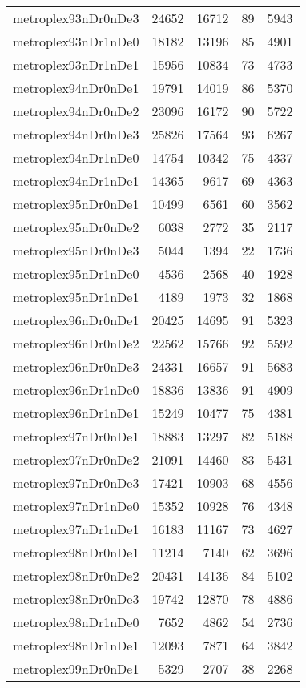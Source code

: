 \begin{longtable}{lrrrr}
metroplex93nDr0nDe3 & 24652 & 16712 & 89 & 5943 \\
metroplex93nDr1nDe0 & 18182 & 13196 & 85 & 4901 \\
metroplex93nDr1nDe1 & 15956 & 10834 & 73 & 4733 \\
metroplex94nDr0nDe1 & 19791 & 14019 & 86 & 5370 \\
metroplex94nDr0nDe2 & 23096 & 16172 & 90 & 5722 \\
metroplex94nDr0nDe3 & 25826 & 17564 & 93 & 6267 \\
metroplex94nDr1nDe0 & 14754 & 10342 & 75 & 4337 \\
metroplex94nDr1nDe1 & 14365 & 9617 & 69 & 4363 \\
metroplex95nDr0nDe1 & 10499 & 6561 & 60 & 3562 \\
metroplex95nDr0nDe2 & 6038 & 2772 & 35 & 2117 \\
metroplex95nDr0nDe3 & 5044 & 1394 & 22 & 1736 \\
metroplex95nDr1nDe0 & 4536 & 2568 & 40 & 1928 \\
metroplex95nDr1nDe1 & 4189 & 1973 & 32 & 1868 \\
metroplex96nDr0nDe1 & 20425 & 14695 & 91 & 5323 \\
metroplex96nDr0nDe2 & 22562 & 15766 & 92 & 5592 \\
metroplex96nDr0nDe3 & 24331 & 16657 & 91 & 5683 \\
metroplex96nDr1nDe0 & 18836 & 13836 & 91 & 4909 \\
metroplex96nDr1nDe1 & 15249 & 10477 & 75 & 4381 \\
metroplex97nDr0nDe1 & 18883 & 13297 & 82 & 5188 \\
metroplex97nDr0nDe2 & 21091 & 14460 & 83 & 5431 \\
metroplex97nDr0nDe3 & 17421 & 10903 & 68 & 4556 \\
metroplex97nDr1nDe0 & 15352 & 10928 & 76 & 4348 \\
metroplex97nDr1nDe1 & 16183 & 11167 & 73 & 4627 \\
metroplex98nDr0nDe1 & 11214 & 7140 & 62 & 3696 \\
metroplex98nDr0nDe2 & 20431 & 14136 & 84 & 5102 \\
metroplex98nDr0nDe3 & 19742 & 12870 & 78 & 4886 \\
metroplex98nDr1nDe0 & 7652 & 4862 & 54 & 2736 \\
metroplex98nDr1nDe1 & 12093 & 7871 & 64 & 3842 \\
metroplex99nDr0nDe1 & 5329 & 2707 & 38 & 2268 \\

\end{longtable}
